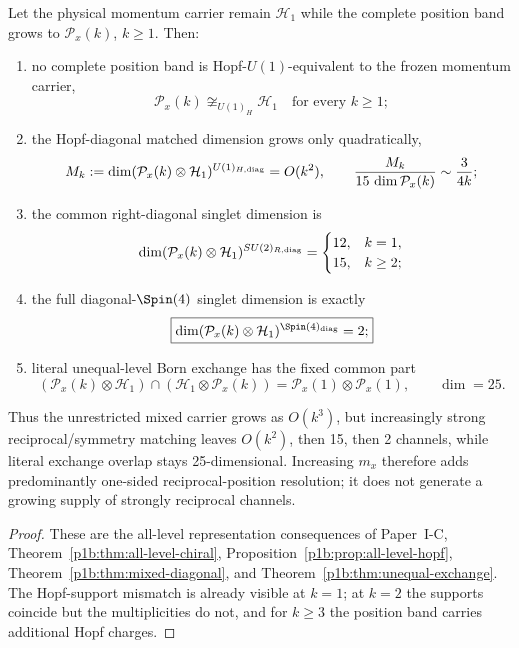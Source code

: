 \documentclass[12pt,a4paper]{article}
\begin{document}
\begin{theorem}[Fixed-\(m_p=1\) reciprocity bottleneck]
\label{p4:thm:v261-fixed-momentum-reciprocity-bottleneck}
Let the physical momentum carrier remain \(\mathcal H_1\) while the complete
position band grows to \(\mathcal P_x(k)\), \(k\ge1\).  Then:
\begin{enumerate}[label=(\alph*),leftmargin=2.1em]
\item no complete position band is Hopf-\(U(1)\)-equivalent to the frozen
      momentum carrier,
      \[
       \boxed{\mathcal P_x(k)\not\cong_{U(1)_H}\mathcal H_1
       \quad\text{for every }k\ge1;}
      \]
\item the Hopf-diagonal matched dimension grows only quadratically,
      \[
       M_k:=\dim(\mathcal P_x(k)\otimes\mathcal H_1)^{U(1)_{H,\rm diag}}
       =O(k^2),\qquad
       \frac{M_k}{15\,\dim\mathcal P_x(k)}\sim\frac{3}{4k};
      \]
\item the common right-diagonal singlet dimension is
      \[
       \dim(\mathcal P_x(k)\otimes\mathcal H_1)^{SU(2)_{R,\rm diag}}
       =\begin{cases}12,&k=1,\\15,&k\ge2;\end{cases}
      \]
\item the full diagonal-\(\Spin(4)\) singlet dimension is exactly
      \[
       \boxed{\dim(\mathcal P_x(k)\otimes\mathcal H_1)^{\Spin(4)_{\rm diag}}=2;}
      \]
\item literal unequal-level Born exchange has the fixed common part
      \[
       \boxed{
       (\mathcal P_x(k)\otimes\mathcal H_1)
       \cap(\mathcal H_1\otimes\mathcal P_x(k))
       =\mathcal P_x(1)\otimes\mathcal P_x(1),
       \qquad\dim=25.}
      \]
\end{enumerate}
Thus the unrestricted mixed carrier grows as \(O(k^3)\), but increasingly
strong reciprocal/symmetry matching leaves \(O(k^2)\), then 15, then 2
channels, while literal exchange overlap stays 25-dimensional.  Increasing
\(m_x\) therefore adds predominantly one-sided reciprocal-position resolution;
it does not generate a growing supply of strongly reciprocal channels.
\end{theorem}

\begin{proof}
These are the all-level representation consequences of Paper~I-C,
Theorem~\ref{p1b:thm:all-level-chiral},
Proposition~\ref{p1b:prop:all-level-hopf},
Theorem~\ref{p1b:thm:mixed-diagonal}, and
Theorem~\ref{p1b:thm:unequal-exchange}.  The Hopf-support mismatch is already
visible at \(k=1\); at \(k=2\) the supports coincide but the multiplicities do
not, and for \(k\ge3\) the position band carries additional Hopf charges.
\end{proof}
\end{document}

